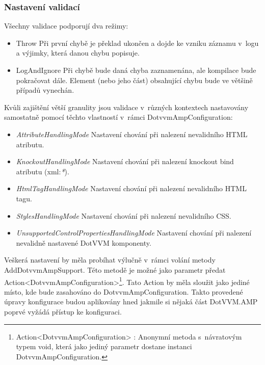 \subsubsection{Nastavení validací} \label{validationModes}
Všechny validace podporují dva režimy:
\begin{itemize}
    \item Throw \newline
    Při první chybě je překlad ukončen a dojde ke vzniku záznamu v~logu a výjimky, která danou chybu popisuje.
    \item LogAndIgnore \newline
    Při chybě bude daná chyba zaznamenána, ale kompilace bude pokračovat dále. Element (nebo jeho část) obsahující chybu bude ve většině případů vynechán.
\end{itemize}
Kvůli zajištění větší granulity jsou validace v~různých kontextech nastavovány samostatně pomocí těchto vlastností v~rámci DotvvmAmpConfiguration: 
\begin{itemize}
    \item \textit{AttributeHandlingMode} \newline
    Nastavení chování při nalezení nevalidního HTML atributu.
    \item \textit{KnockoutHandlingMode}\newline
    Nastavení chování při nalezení knockout bind atributu (xml:\textit{*}).
    \item \textit{HtmlTagHandlingMode}\newline
    Nastavení chování při nalezení nevalidního HTML tagu.
    \item \textit{StylesHandlingMode}\newline
    Nastavení chování při nalezení nevalidního CSS.
    \item \textit{UnsupportedControlPropertiesHandlingMode}\newline
    Nastavení chování při nalezení nevalidně nastavené DotVVM komponenty.
\end{itemize}

Veškerá nastavení by měla probíhat výlučně v~rámci volání metody AddDotvvmAmpSupport. Této metodě je možné jako parametr předat Action<DotvvmAmpConfiguration>\footnote{Action<DotvvmAmpConfiguration> : Anonymní metoda s~návratovým typem void, která jako jediný parametr dostane instanci DotvvmAmpConfiguration.}. Tato Action by měla sloužit jako jediné místo, kde bude zasahováno do DotvvmAmpConfiguration. Takto provedené úpravy konfigurace budou aplikovány hned jakmile si nějaká část DotVVM.AMP poprvé vyžádá přístup ke konfiguraci.

